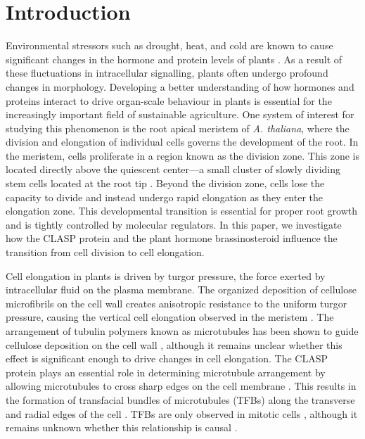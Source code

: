 \documentclass[referee,pdflatex,sn-mathphys-num]{sn-jnl}
\begin{document}
\section*{Introduction}\label{sec1}

Environmental stressors such as drought, heat, and cold are known to cause significant changes in the hormone and protein levels of plants \cite{halat2020}.
As a result of these fluctuations in intracellular signalling, plants often undergo profound changes in morphology.
Developing a better understanding of how hormones and proteins interact to drive organ-scale behaviour in plants is essential for the increasingly important field of sustainable agriculture.
One system of interest for studying this phenomenon is the root apical meristem of \emph{A. thaliana}, where the division and elongation of individual cells governs the development of the root.
In the meristem, cells proliferate in a region known as the division zone.
This zone is located directly above the quiescent center—a small cluster of slowly dividing stem cells located at the root tip \cite{verbelen2006}.
Beyond the division zone, cells lose the capacity to divide and instead undergo rapid elongation as they enter the elongation zone.
This developmental transition is essential for proper root growth and is tightly controlled by molecular regulators.
In this paper, we investigate how the CLASP protein and the plant hormone brassinosteroid influence the transition from cell division to cell elongation.

Cell elongation in plants is driven by turgor pressure, the force exerted by intracellular fluid on the plasma membrane.
The organized deposition of cellulose microfibrils on the cell wall creates anisotropic resistance to the uniform turgor pressure, causing the vertical cell elongation observed in the meristem \cite{hamant2010}.
The arrangement of tubulin polymers known as microtubules has been shown to guide cellulose deposition on the cell wall \cite{hamant2010}, although it remains unclear whether this effect is significant enough to drive changes in cell elongation.
The CLASP protein plays an essential role in determining microtubule arrangement by allowing microtubules to cross sharp edges on the cell membrane \cite{ambrose2011}.
This results in the formation of transfacial bundles of microtubules (TFBs) along the transverse and radial edges of the cell \cite{halat2022}.
TFBs are only observed in mitotic cells \cite{ambrose2011}, although it remains unknown whether this relationship is causal \cite{halat2022}. 
\end{document}
